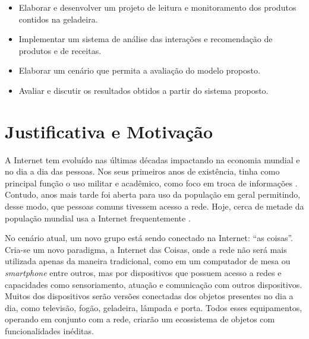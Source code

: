 \begin{itemize} \parskip -1pt
	\item Elaborar e desenvolver um projeto de leitura e monitoramento dos produtos contidos na geladeira.
	\item Implementar um sistema de análise das interações e recomendação de produtos e de receitas.
	\item Elaborar um cenário que permita a avaliação do modelo proposto.
	\item Avaliar e discutir os resultados obtidos a partir do sistema proposto.


\end{itemize}

\section{Justificativa e Motivação}

A Internet tem evoluído nas últimas décadas impactando na economia mundial e no dia a dia das pessoas. Nos seus primeiros anos de existência, tinha como principal função o uso militar e acadêmico, como foco em troca de informações \cite{Leiner2012}. Contudo, anos mais tarde foi aberta para uso da população em geral permitindo, desse modo, que pessoas comuns tivessem acesso a rede. Hoje, cerca de metade da população mundial usa a Internet frequentemente \cite{MiniwattsMarketingGroup2016}. 

No cenário atual, um novo grupo está sendo conectado na Internet: ``as coisas''. Cria-se um novo paradigma, a Internet das Coisas, onde a rede não será mais utilizada apenas da maneira tradicional, como em um computador de mesa ou \textit{smartphone} entre outros, mas por dispositivos que possuem acesso a redes e capacidades como sensoriamento, atuação e comunicação com outros dispositivos. Muitos dos dispositivos serão versões conectadas dos objetos presentes no dia a dia, como televisão, fogão, geladeira, lâmpada e porta. Todos esses equipamentos, operando em conjunto com a rede, criarão um ecossistema de objetos com funcionalidades inéditas. 

